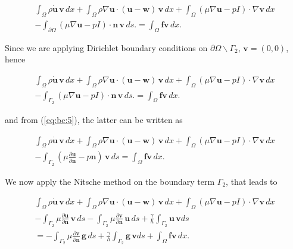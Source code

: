 \documentclass[11pt,a4paper,titlepage]{report}
\begin{document}
\begin{align}
\int_{\Omega} \rho \dot{\mathbf{u}} \, \mathbf{v} \, dx
+ \int_{\Omega} \rho \nabla \mathbf{u} \cdot (\mathbf{u} - \mathbf{w}) \, \mathbf{v} \, dx
+ \int_{\Omega} (\mu \nabla \mathbf{u} - pI) \cdot \nabla \mathbf{v} \, dx \\
- \int_{\partial \Omega} (\mu \nabla \mathbf{u} - pI) \cdot \mathbf{n} \, \mathbf{v} \, ds.
= \int_{\Omega} \mathbf{f} \mathbf{v} \, dx.
\end{align}

Since we are applying Dirichlet boundary conditions on $\partial \Omega \backslash \Gamma_2$, $\mathbf{v} = (0,0)$, hence 

\begin{align}
\int_{\Omega} \rho \dot{\mathbf{u}} \, \mathbf{v} \, dx
+ \int_{\Omega} \rho \nabla \mathbf{u} \cdot (\mathbf{u} - \mathbf{w}) \, \mathbf{v} \, dx
+ \int_{\Omega} (\mu \nabla \mathbf{u} - pI) \cdot \nabla \mathbf{v} \, dx \\
- \int_{\Gamma_2} (\mu \nabla \mathbf{u} - pI) \cdot \mathbf{n} \, \mathbf{v} \, ds.
= \int_{\Omega} \mathbf{f} \mathbf{v} \, dx.
\end{align}

and from (\ref{eq:bc:5}), the latter can be written as

\begin{align}
\int_{\Omega} \rho \dot{\mathbf{u}} \, \mathbf{v} \, dx
+ \int_{\Omega} \rho \nabla \mathbf{u} \cdot (\mathbf{u} - \mathbf{w}) \, \mathbf{v} \, dx
+ \int_{\Omega} (\mu \nabla \mathbf{u} - pI) \cdot \nabla \mathbf{v} \, dx \\
- \int_{\Gamma_2} (\mu \frac{\partial \mathbf{u}}{\partial \mathbf{n}} -  p \mathbf{n}) \, \mathbf{v} \, ds
= \int_{\Omega} \mathbf{f} \mathbf{v} \, dx.
\end{align}

We now apply the Nitsche method on the boundary term $\Gamma_2$, that leads to

\begin{align}
\int_{\Omega} \rho \dot{\mathbf{u}} \, \mathbf{v} \, dx
+ \int_{\Omega} \rho \nabla \mathbf{u} \cdot (\mathbf{u} - \mathbf{w}) \, \mathbf{v} \, dx
+ \int_{\Omega} (\mu \nabla \mathbf{u} - pI) \cdot \nabla \mathbf{v} \, dx \\
- \int_{\Gamma_2} \mu \frac{\partial \mathbf{u}}{\partial \mathbf{n}} \, \mathbf{v} \, ds
- \int_{\Gamma_2} \mu \frac{\partial \mathbf{v}}{\partial \mathbf{n}}  \, \mathbf{u} \, ds
+ \frac{\gamma}{h} \int_{\Gamma_2} \mathbf{u \, v} ds \\
= - \int_{\Gamma_2} \mu \frac{\partial \mathbf{v}}{\partial \mathbf{n}}  \, \mathbf{g} \, ds
+ \frac{\gamma}{h} \int_{\Gamma_2} \mathbf{g \, v} ds
+  \int_{\Omega} \mathbf{f} \mathbf{v} \, dx.
\end{align}
\end{document}
